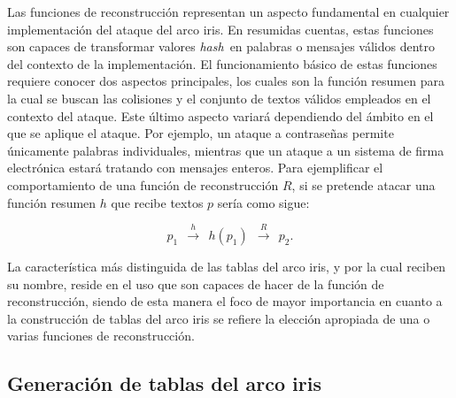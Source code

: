 \documentclass[12pt,spanish,listoffigures,listoftables,listofalgorithms]{tfgetsinf}
\newcommand{\hash}{\textit{hash}}
\begin{document}
Las funciones de reconstrucción representan un aspecto fundamental en cualquier implementación del ataque del arco iris. En resumidas cuentas, estas funciones son capaces de transformar valores \hash~en palabras o mensajes válidos dentro del contexto de la implementación. El funcionamiento básico de estas funciones requiere conocer dos aspectos principales, los cuales son la función resumen para la cual se buscan las colisiones y el conjunto de textos válidos empleados en el contexto del ataque. Este último aspecto variará dependiendo del ámbito en el que se aplique el ataque. Por ejemplo, un ataque a contraseñas permite únicamente palabras individuales, mientras que un ataque a un sistema de firma electrónica estará tratando con mensajes enteros. Para ejemplificar el comportamiento de una función de reconstrucción $R$, si se pretende atacar una función resumen $h$ que recibe textos $p$ sería como sigue:

\begin{center}
	\begin{equation}
		\tag{3}
		p_1~~ \xrightarrow{h}~~ h(p_1)~~ \xrightarrow{R}~~ p_2 .
		\label{reconstrucción}
	\end{equation}
\end{center}

La característica más distinguida de las tablas del arco iris, y por la cual reciben su nombre, reside en el uso que son capaces de hacer de la función de reconstrucción, siendo de esta manera el foco de mayor importancia en cuanto a la construcción de tablas del arco iris se refiere la elección apropiada de una o varias funciones de reconstrucción.


\subsection{Generación de tablas del arco iris}
\end{document}
